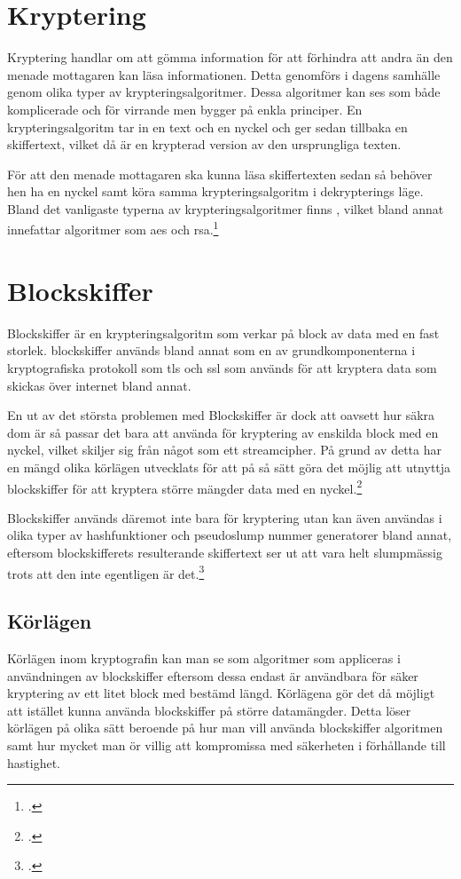 
\section{Kryptering}
Kryptering handlar om att gömma information för att förhindra att andra än den menade mottagaren kan läsa informationen.
Detta genomförs i dagens samhälle genom olika typer av krypteringsalgoritmer. Dessa algoritmer kan ses som både komplicerade
och för virrande men bygger på enkla principer. En krypteringsalgoritm tar in en text och en nyckel och ger sedan tillbaka en
skiffertext, vilket då är en krypterad version av den ursprungliga texten.

För att den menade mottagaren ska kunna läsa skiffertexten sedan så behöver hen ha en nyckel samt köra samma krypteringsalgoritm
i dekrypterings läge. Bland det vanligaste typerna av krypteringsalgoritmer finns ,
vilket bland annat innefattar algoritmer som \acrshort{aes} och \gls{rsa}.\footcite{kryptering}

\section{Blockskiffer}
\label{sec:blockskiffer}
Blockskiffer är en krypteringsalgoritm som verkar på block av data med en fast storlek.
blockskiffer används bland annat som en av grundkomponenterna i kryptografiska protokoll som \acrfull{tls} och \acrfull{ssl}
som används för att kryptera data som skickas över internet bland annat.

En ut av det största problemen med Blockskiffer är dock att oavsett hur säkra dom är så passar det bara att använda
för kryptering av enskilda block med en nyckel, vilket skiljer sig från något som ett \gls{streamcipher}.
På grund av detta har en mängd olika körlägen utvecklats för att på så sätt göra det möjlig att utnyttja
blockskiffer för att kryptera större mängder data med en nyckel.\footcite{blockskiffer-ref}

Blockskiffer används däremot inte bara för kryptering utan kan även användas i olika typer av \gls{hashfunktion}er
och \gls{pseudoslump} nummer generatorer bland annat, eftersom blockskifferets resulterande skiffertext ser ut att vara helt slumpmässig
trots att den inte egentligen är det.\footcite{blockskiffer-ref}

\subsection{Körlägen}
Körlägen inom kryptografin kan man se som algoritmer som appliceras i användningen av
blockskiffer eftersom dessa endast är användbara för säker kryptering av ett litet block med bestämd längd.
Körlägena gör det då möjligt att istället kunna använda blockskiffer på större datamängder.
Detta löser körlägen på olika sätt beroende på hur man vill använda blockskiffer algoritmen samt hur
mycket man ör villig att kompromissa med säkerheten i förhållande till hastighet.

